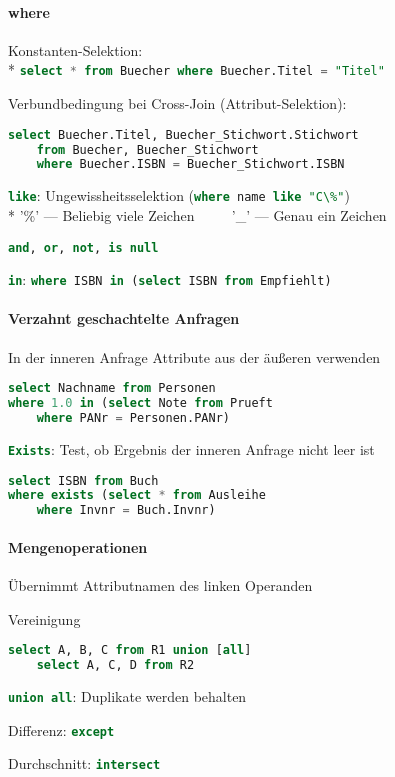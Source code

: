 \paragraph{where}
\begin{items}
	\item Konstanten-Selektion: \\*
	\lstinline[language=sql]{select * from Buecher where Buecher.Titel = "Titel"}
	\item Verbundbedingung bei Cross-Join (Attribut-Selektion):
	\begin{lstlisting}[language=sql]
select Buecher.Titel, Buecher_Stichwort.Stichwort
	from Buecher, Buecher_Stichwort
	where Buecher.ISBN = Buecher_Stichwort.ISBN
	\end{lstlisting}
	\item \lstinline[language=sql]{like}: Ungewissheitsselektion
	(\lstinline[language=sql]{where name like "C\%"})\\*
	'\%' --- Beliebig viele Zeichen $\qquad$ '\_' --- Genau ein Zeichen
	\item \lstinline[language=sql]{and, or, not, is null}
	\item \lstinline[language=sql]{in}: \lstinline[language=sql]{where ISBN in (select ISBN from Empfiehlt)}
\end{items}

\paragraph{Verzahnt geschachtelte Anfragen}
\begin{items}
	\item In der inneren Anfrage Attribute aus der äußeren verwenden
	\begin{lstlisting}[language=sql]
select Nachname from Personen
where 1.0 in (select Note from Prueft
	where PANr = Personen.PANr)
	\end{lstlisting}
	\item \lstinline[language=sql]{Exists}: Test, ob Ergebnis der inneren Anfrage nicht leer ist
	\begin{lstlisting}[language=sql]
select ISBN from Buch
where exists (select * from Ausleihe
	where Invnr = Buch.Invnr)
	\end{lstlisting}
\end{items}

\paragraph{Mengenoperationen}
\begin{items}
	\item Übernimmt Attributnamen des linken Operanden
	\item Vereinigung
	\begin{lstlisting}[language=sql]
select A, B, C from R1 union [all]
	select A, C, D from R2
	\end{lstlisting}
	\item \lstinline[language=sql]{union all}: Duplikate werden behalten
	\item Differenz: \lstinline[language=sql]{except}
	\item Durchschnitt: \lstinline[language=sql]{intersect}
\end{items}

